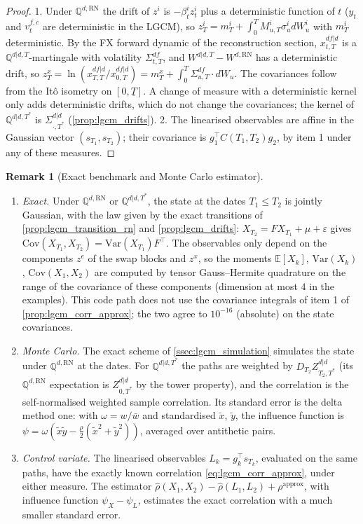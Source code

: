 \documentclass[11pt,english]{amsart}
\newcommand{\RN}{\mathrm{RN}}
\newcommand{\EE}{\mathbb{E}}
\newcommand{\QQ}{\mathbb{Q}}
\newcommand{\Cov}{\mathrm{Cov}}
\theoremstyle{definition}
\newtheorem{rema}{Remark}
\begin{document}
\begin{proof}
1. Under $\QQ^{d,\RN}$ the drift of $z^i$ is $-\beta^i_tz^i_t$ plus a deterministic function of $t$ ($y_t$ and $v^{f,c}_t$ are deterministic in the LGCM), so $z^i_T = m^i_T + \int_0^T M^i_{u,T}\sigma^i_u dW^i_u$ with $m^i_T$ deterministic. By the FX forward dynamic of the reconstruction section, $x^{df|d}_{t,T}$ is a $\QQ^{d|d,T}$-martingale with volatility $\Sigma^{df}_{t,T}$, and $W^{d|d,T} - W^{d,\RN}$ has a deterministic drift, so $z^x_T = \ln(x^{df|d}_{T,T}/x^{df|d}_{0,T}) = m^x_T + \int_0^T\Sigma^{df}_{u,T}\cdot dW_u$. The covariances follow from the It\^o isometry on $[0,\underline{T}]$. A change of measure with a deterministic kernel only adds deterministic drifts, which do not change the covariances; the kernel of $\QQ^{d|d,T^*}$ is $\Sigma^{d|d}_{\cdot,T^*}$ (\autoref{prop:lgcm_drifts}). 2. The linearised observables are affine in the Gaussian vector $(s_{T_1},s_{T_2})$; their covariance is $g_1^\top C(T_1,T_2)g_2$, by item 1 under any of these measures.
\end{proof}

\begin{rema}[Exact benchmark and Monte Carlo estimator]\label{rema:lgcm_corr_exact}
\begin{enumerate}
\item \emph{Exact.} Under $\QQ^{d,\RN}$ or $\QQ^{d|d,T^*}$, the state at the dates $T_1\le T_2$ is jointly Gaussian, with the law given by the exact transitions of \autoref{prop:lgcm_transition_rn} and \autoref{prop:lgcm_drifts}: $X_{T_2} = F X_{T_1} + \mu + \varepsilon$ gives $\Cov(X_{T_1},X_{T_2}) = \mathrm{Var}(X_{T_1})F^\top$. The observables only depend on the components $z^e$ of the swap blocks and $z^x$, so the moments $\EE[X_k]$, $\mathrm{Var}(X_k)$, $\Cov(X_1,X_2)$ are computed by tensor Gauss--Hermite quadrature on the range of the covariance of these components (dimension at most $4$ in the examples). This code path does not use the covariance integrals of item 1 of \autoref{prop:lgcm_corr_approx}; the two agree to $10^{-16}$ (absolute) on the state covariances.
\item \emph{Monte Carlo.} The exact scheme of \autoref{ssec:lgcm_simulation} simulates the state under $\QQ^{d,\RN}$ at the dates. For $\QQ^{d|d,T^*}$ the paths are weighted by $D_{T_2}Z^{d|d}_{T_2,T^*}$ (its $\QQ^{d,\RN}$ expectation is $Z^{d|d}_{0,T^*}$ by the tower property), and the correlation is the self-normalised weighted sample correlation. Its standard error is the delta method one: with $\omega = w/\bar{w}$ and standardised $\tilde{x}$, $\tilde{y}$, the influence function is $\psi = \omega(\tilde{x}\tilde{y} - \frac{\rho}{2}(\tilde{x}^2+\tilde{y}^2))$, averaged over antithetic pairs.
\item \emph{Control variate.} The linearised observables $L_k = g_k^\top s_{T_k}$, evaluated on the same paths, have the exactly known correlation \eqref{eq:lgcm_corr_approx}, under either measure. The estimator $\hat\rho(X_1,X_2) - \hat\rho(L_1,L_2) + \rho^{\mathrm{approx}}$, with influence function $\psi_X - \psi_L$, estimates the exact correlation with a much smaller standard error.
\end{enumerate}
\end{rema}
\end{document}
